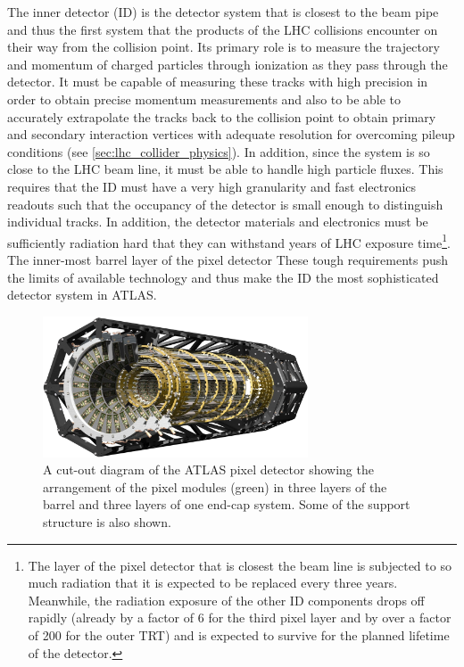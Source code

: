 The inner detector (ID) is the 
detector system that is closest to the beam pipe and thus the
first system that the products of the LHC collisions encounter
on their way from the collision point. Its primary role is 
to measure the trajectory and momentum of charged particles
through ionization as they pass through the detector.
It must be capable of measuring these tracks with high precision
in order to obtain precise momentum measurements and also to be able
to accurately extrapolate the tracks back to the collision point
to obtain primary and secondary interaction vertices with adequate
resolution for overcoming pileup 
conditions (see \sec\ref{sec:lhc_collider_physics}). In addition,
since the system is so close to the LHC beam line, it
must be able to handle high particle fluxes. This requires that
the ID must have a very high granularity and fast electronics
readouts such that the occupancy of the
detector is small enough to distinguish individual tracks. In addition,
the detector materials and electronics must be sufficiently radiation
hard that they can withstand years of LHC 
exposure time\footnote{The layer of the pixel detector that is closest
the beam line is subjected to so much radiation that it is expected to be replaced
every three years.  Meanwhile, the radiation exposure of the other ID
components drops off rapidly (already by a factor of 6 for the third
pixel layer and by over a factor of 200 for the outer TRT) and is 
expected to survive for the planned lifetime of the detector.}.
The inner-most barrel layer of the pixel detector 
These tough requirements push the limits of available technology and thus
make the ID the most sophisticated detector system in ATLAS.



\begin{figure}[ht!]
\centering
\includegraphics[width=0.7\textwidth]{figures/atlas/pixel.eps}
\caption{A cut-out diagram of the ATLAS pixel detector showing 
the arrangement of the pixel modules (green) in three layers of the barrel
and three layers of one end-cap system. Some of the support structure is
also shown.}
\label{fig:atlas_pixel}
\end{figure}

